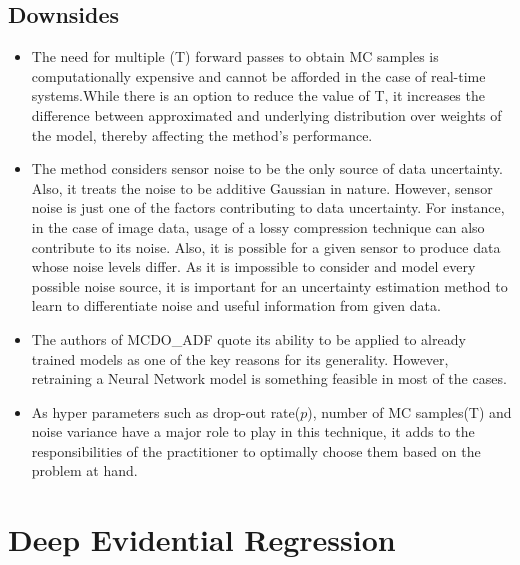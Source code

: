 	\subsection{Downsides}
	\begin{itemize}
		\item The need for multiple (T) forward passes to obtain MC samples is computationally expensive and cannot be afforded in the case of real-time systems.While there is an option to reduce the value of T, it increases the difference between approximated and underlying distribution over weights of the model, thereby affecting the method's performance. 
		\item The method considers sensor noise to be the only source of data uncertainty. Also, it treats the noise to be additive Gaussian in nature. However, sensor noise is just one of the factors contributing to data uncertainty. For instance, in the case of image data, usage of a lossy compression technique can also contribute to its noise. Also, it is possible for a given sensor to produce data whose noise levels differ. As it is impossible to consider and model every possible noise source, it is important for an uncertainty estimation method to learn to differentiate noise and useful information from given data.
		\item The authors of MCDO\_ADF quote its ability to be applied to already trained models as one of the key reasons for its generality. However, retraining a Neural Network model is something feasible in most of the cases.
		\item As hyper parameters such as drop-out rate($p$), number of MC samples(T) and noise variance have a major role to play in this technique, it adds to the responsibilities of the practitioner to optimally choose them based on the problem at hand.
	\end{itemize}    
	\pagebreak
	\section{Deep Evidential Regression}\label{der}
	

